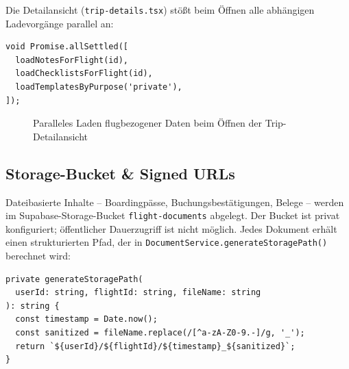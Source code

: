 Die Detailansicht (\texttt{trip-details.tsx}) stößt beim Öffnen alle abhängigen
Ladevorgänge parallel an:

\begin{lstlisting}[style=skyline-ts,
  caption={Paralleles Vorladen in der Trip-Detailansicht (app/trip-details.tsx)},
  label={lst:parallel_load}]
void Promise.allSettled([
  loadNotesForFlight(id),
  loadChecklistsForFlight(id),
  loadTemplatesByPurpose('private'),
]);
\end{lstlisting}

\begin{figure}[H]
  \centering
  \caption{Paralleles Laden flugbezogener Daten beim Öffnen der Trip-Detailansicht}
  \label{fig:parallel_load}
\end{figure}

\subsection{Storage-Bucket \& Signed URLs}

Dateibasierte Inhalte -- Boardingpässe, Buchungsbestätigungen, Belege -- werden im
Supabase-Storage-Bucket \texttt{flight-documents} abgelegt.
Der Bucket ist privat konfiguriert; öffentlicher Dauerzugriff ist nicht möglich.
Jedes Dokument erhält einen strukturierten Pfad,
der in \texttt{DocumentService.generateStoragePath()} berechnet wird:

\begin{lstlisting}[style=skyline-ts,
  caption={Pfadgenerierung im Storage-Bucket (services/documentService.ts)},
  label={lst:storage_path}]
private generateStoragePath(
  userId: string, flightId: string, fileName: string
): string {
  const timestamp = Date.now();
  const sanitized = fileName.replace(/[^a-zA-Z0-9.-]/g, '_');
  return `${userId}/${flightId}/${timestamp}_${sanitized}`;
}
\end{lstlisting}

